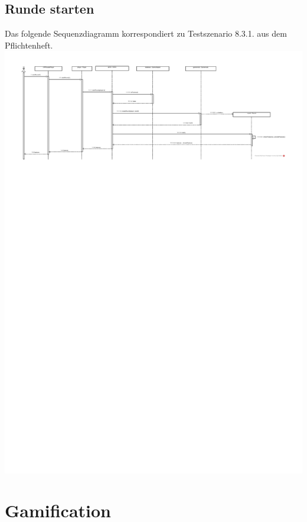 \documentclass[a4paper]{scrreprt}
\begin{document}
	\subsection{Runde starten}
	Das folgende Sequenzdiagramm korrespondiert zu Testszenario 8.3.1. aus dem Pflichtenheft. \\
	\includegraphics[width=\textwidth]{img/Runde_starten.pdf}

	\section{Gamification}
\end{document}
